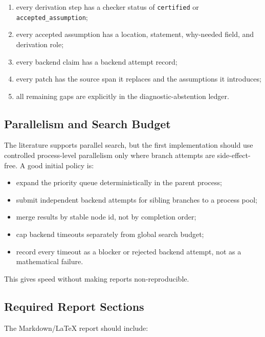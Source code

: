\documentclass[11pt]{article}
\begin{document}
\begin{enumerate}[leftmargin=*]
\item every derivation step has a checker status of \texttt{certified} or
  \texttt{accepted\_assumption};
\item every accepted assumption has a location, statement, why-needed field,
  and derivation role;
\item every backend claim has a backend attempt record;
\item every patch has the source span it replaces and the assumptions it
  introduces;
\item all remaining gaps are explicitly in the diagnostic-abstention ledger.
\end{enumerate}

\subsection{Parallelism and Search Budget}

The literature supports parallel search, but the first implementation should
use controlled process-level parallelism only where branch attempts are
side-effect-free. A good initial policy is:

\begin{itemize}[leftmargin=*]
\item expand the priority queue deterministically in the parent process;
\item submit independent backend attempts for sibling branches to a process
  pool;
\item merge results by stable node id, not by completion order;
\item cap backend timeouts separately from global search budget;
\item record every timeout as a blocker or rejected backend attempt, not as a
  mathematical failure.
\end{itemize}

This gives speed without making reports non-reproducible.

\subsection{Required Report Sections}

The Markdown/LaTeX report should include:
\end{document}
